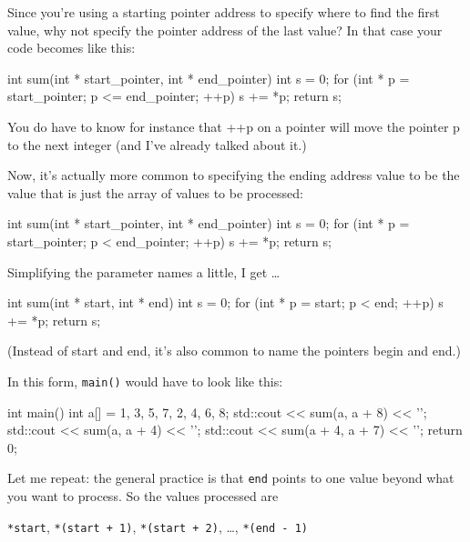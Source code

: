 Since you're using a starting pointer address to specify where to find the first value, why not specify the pointer address of the last value? In that case your code becomes  like this:

\begin{consolethree}[escapeinside=||]
int sum(int * start_pointer, int * end_pointer)
{
    int s = 0;
    for (int * p = start_pointer;
         p <= end_pointer; ++p)
    {
        s += *p;
    }
    return s;
}
\end{consolethree}

You do have to know for instance that ++p on a pointer will move the pointer p to the next integer (and I've already talked about it.)

Now, it's actually more common to specifying the ending address value to be the value that is just  the array of values to be processed:

\begin{consolethree}[escapeinside=||]
int sum(int * start_pointer, int * end_pointer)
{
    int s = 0;
    for (int * p = start_pointer;
         p < end_pointer; ++p)
    {
        s += *p;
    }
    return s;
}
\end{consolethree}

Simplifying the parameter names a little, I get \ldots{}

\begin{consolethree}[escapeinside=||]
int sum(int * start, int * end)
{
    int s = 0;
    for (int * p = start; p < end; ++p)
    {
        s += *p;
    }
    return s;
}
\end{consolethree}

(Instead of start and end, it's also common to name the pointers begin and end.)

In this form, \texttt{main()} would have to look like this:

\begin{consolethree}[escapeinside=||]
int main()
{
    int a[] = {1, 3, 5, 7, 2, 4, 6, 8};
    std::cout << sum(a, a + 8) << '\n';
    std::cout << sum(a, a + 4) << '\n';
    std::cout << sum(a + 4, a + 7) << '\n';
    return 0;
}
\end{consolethree}

Let me repeat: the general practice is that \texttt{end} points to one
value beyond what you want to process. So the values processed are

\texttt{*start}, \texttt{*(start + 1)}, \texttt{*(start + 2)}, \ldots,
\texttt{*(end - 1)}

